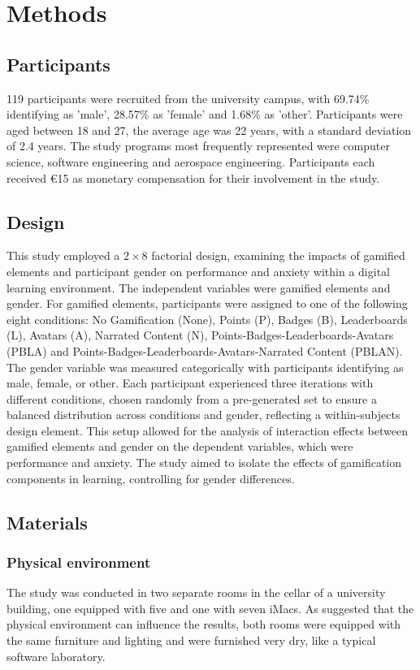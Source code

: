 \section{Methods}
\subsection{Participants}
119 participants were recruited from the university campus, with 69.74\% identifying as 'male', 28.57\% as 'female' and 1.68\% as 'other'.
Participants were aged between 18 and 27, the average age was 22 years, with a standard deviation of 2.4 years.
The study programs most frequently represented were computer science, software engineering and aerospace engineering.
Participants each received €15 as monetary compensation for their involvement in the study.

\subsection{Design}
This study employed a $2 \times 8$ factorial design, examining the impacts of gamified elements and participant gender on performance and anxiety within a digital learning environment.
The independent variables were gamified elements and gender.
For gamified elements, participants were assigned to one of the following eight conditions: No Gamification (None), Points (P), Badges (B), Leaderboards (L), Avatars (A), Narrated Content (N), Points-Badges-Leaderboards-Avatars (PBLA) and Points-Badges-Leaderboards-Avatars-Narrated Content (PBLAN).
The gender variable was measured categorically with participants identifying as male, female, or other.
Each participant experienced three iterations with different conditions, chosen randomly from a pre-generated set to ensure a balanced distribution across conditions and gender, reflecting a within-subjects design element.
This setup allowed for the analysis of interaction effects between gamified elements and gender on the dependent variables, which were performance and anxiety.
The study aimed to isolate the effects of gamification components in learning, controlling for gender differences.

\subsection{Materials}
\subsubsection{Physical environment}
The study was conducted in two separate rooms in the cellar of a university building, one equipped with five and one with seven iMacs.
As \textcite{christyLeaderboardsVirtualClassroom2014} suggested that the physical environment can influence the results, both rooms were equipped with the same furniture and lighting and were furnished very dry, like a typical software laboratory.

